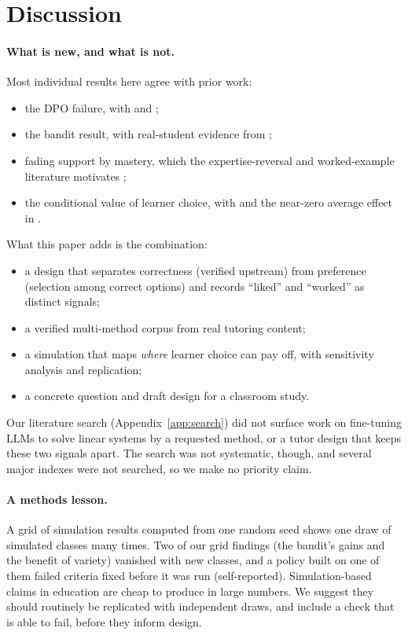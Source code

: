 \documentclass[11pt,a4paper]{article}
\begin{document}
\section{Discussion}
\label{sec:discussion}

\paragraph{What is new, and what is not.}
Most individual results here agree with prior work:
\begin{itemize}
  \item the DPO failure, with \citet{pal2024smaug} and \citet{pang2024iterative};
  \item the bandit result, with real-student evidence from \citet{schmucker2025learning};
  \item fading support by mastery, which the expertise-reversal and worked-example
        literature motivates \citep{kalyuga2003expertise,renkl2003structuring,salden2010expertise};
  \item the conditional value of learner choice, with \citet{mihalca2017accuracy} and the
        near-zero average effect in \citet{karich2014updated}.
\end{itemize}
What this paper adds is the combination:
\begin{itemize}
  \item a design that separates correctness (verified upstream) from preference (selection
        among correct options) and records ``liked'' and ``worked'' as distinct signals;
  \item a verified multi-method corpus from real tutoring content;
  \item a simulation that maps \emph{where} learner choice can pay off, with sensitivity
        analysis and replication;
  \item a concrete question and draft design for a classroom study.
\end{itemize}
Our literature search (Appendix~\ref{app:search}) did not surface work on fine-tuning LLMs
to solve linear systems by a requested method, or a tutor design that keeps these two
signals apart. The search was not systematic, though, and several major indexes were not
searched, so we make no priority claim.

\paragraph{A methods lesson.}
A grid of simulation results computed from one random seed shows one draw of simulated
classes many times. Two of our grid findings (the bandit's gains and the benefit of
variety) vanished with new classes, and a policy built on one of them failed criteria
fixed before it was run (self-reported). Simulation-based claims in education are cheap to produce in large
numbers. We suggest they should routinely be replicated with independent draws, and
include a check that is able to fail, before they inform design.
\end{document}
